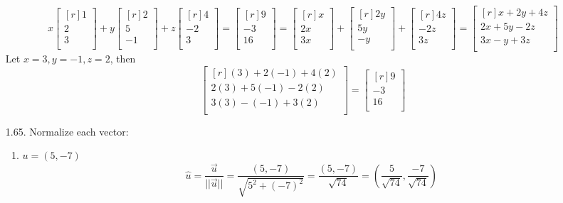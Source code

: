 \documentclass[12pt]{article}
\begin{document}
\begin{enumerate}
	\[ x \begin{bmatrix}[r] 1\\ 2\\ 3\\ \end{bmatrix}
	+ y \begin{bmatrix}[r] 2\\ 5\\ -1\\ \end{bmatrix}
	+ z \begin{bmatrix}[r] 4\\ -2\\ 3\\ \end{bmatrix}
	= \begin{bmatrix}[r] 9\\ -3\\ 16\\ \end{bmatrix}
	= \begin{bmatrix}[r] x\\ 2x\\ 3x\\ \end{bmatrix}
	+ \begin{bmatrix}[r] 2y\\ 5y\\ -y\\ \end{bmatrix}
	+ \begin{bmatrix}[r] 4z\\ -2z\\ 3z\\ \end{bmatrix}
	= \begin{bmatrix}[r] x+2y+4z\\ 2x+5y-2z\\ 3x-y+3z\\ \end{bmatrix}
	\]
	Let $x=3,y=-1,z=2$, then
	\[ \begin{bmatrix}[r] (3)+2(-1)+4(2)\\ 2(3)+5(-1)-2(2)\\ 3(3)-(-1)+3(2)\\ \end{bmatrix}
	= \begin{bmatrix}[r] 9\\ -3\\ 16\\ \end{bmatrix} \] 
\item[1.65.] Normalize each vector:
	\begin{enumerate}
	\item $u=(5,-7)$\\
		\[ \hat{u} = \frac{\vec{u}}{||\vec{u}||} = \frac{(5,-7)}{\sqrt{5^2 + (-7)^2}} = \frac{(5,-7)}{\sqrt{74}} = (\frac{5}{\sqrt{74}},\frac{-7}{\sqrt{74}}) \]
	

\end{enumerate}
\end{enumerate}
\end{document}
